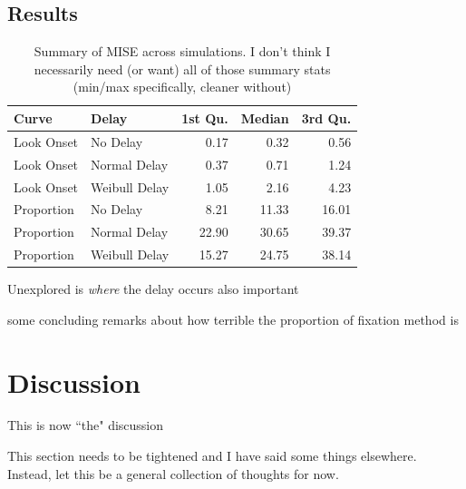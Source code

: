 \documentclass{article}
\begin{document}
\subsection{Results}

\begin{table}[H]
\centering
\begin{tabular}{llrrr}
  \hline
Curve & Delay & 1st Qu. & Median & 3rd Qu. \\ 
  \hline
Look Onset & No Delay & 0.17 & 0.32 & 0.56 \\ 
  Look Onset & Normal Delay & 0.37 & 0.71 & 1.24 \\ 
  Look Onset & Weibull Delay & 1.05 & 2.16 & 4.23 \\ 
  Proportion & No Delay & 8.21 & 11.33 & 16.01 \\ 
  Proportion & Normal Delay & 22.90 & 30.65 & 39.37 \\ 
  Proportion & Weibull Delay & 15.27 & 24.75 & 38.14 \\ 
   \hline
\end{tabular}
\caption{Summary of MISE across simulations. I don't think I necessarily need (or want) all of those summary stats (min/max specifically, cleaner without)}
\label{tab:mise_sims}
\end{table}

Unexplored is \textit{where} the delay occurs also important

some concluding remarks about how terrible the proportion of fixation method is

\section{Discussion}

This is now ``the" discussion

This section needs to be tightened and I have said some things elsewhere. Instead, let this be a general collection of thoughts for now.
\end{document}
